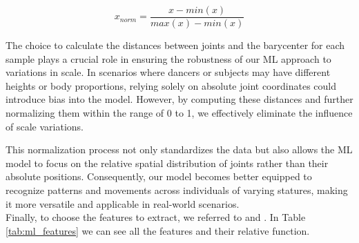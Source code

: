 \begin{equation}
    x_{norm} = \frac{{x - min(x)}}{{max(x) - min(x)}}
    \label{formula:normalization}
\end{equation}
    
The choice to calculate the distances between joints and the barycenter for each sample plays a crucial role in ensuring the robustness of our ML approach to variations in scale.
In scenarios where dancers or subjects may have different heights or body proportions, relying solely on absolute joint coordinates could introduce bias into the model.
However, by computing these distances and further normalizing them within the range of 0 to 1, we effectively eliminate the influence of scale variations.

This normalization process not only standardizes the data but also allows the ML model to focus on the relative spatial distribution of joints rather than their absolute positions.
Consequently, our model becomes better equipped to recognize patterns and movements across individuals of varying statures, making it more versatile and applicable in real-world scenarios. \\
Finally, to choose the features to extract, we referred to \cite{oneto:2020} and \cite{sama:2010}.
In Table \ref{tab:ml_features} we can see all the features and their relative function.

